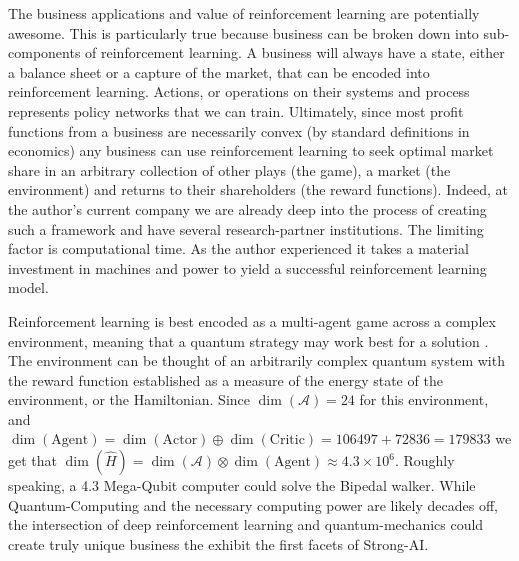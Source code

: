 \documentclass[doc, onecolumn, 12pt]{apa6}
\begin{document}
The business applications and value of reinforcement learning are potentially awesome. This is particularly true because business can be broken down into sub-components of reinforcement learning. A business will always have a state, either a balance sheet or a capture of the market, that can be encoded into reinforcement learning. Actions, or operations on their systems and process represents policy networks that we can train. Ultimately, since most profit functions from a business are necessarily convex (by standard definitions in economics) any business can use reinforcement learning to seek optimal market share in an arbitrary collection of other plays (the game), a market (the environment) and returns to their shareholders (the reward functions). Indeed, at the author's current company  we are already deep into the process of creating such a framework and have several research-partner institutions. The limiting factor is computational time. As the author experienced it takes a material investment in machines and power to yield a successful reinforcement learning model. 

Reinforcement learning is best encoded as a multi-agent game across a complex environment, meaning that a quantum strategy may work best for a solution \citep{Meyer:1999vs, Guo:2008kd}. The environment can be thought of an arbitrarily complex quantum system with the reward function established as a measure of the energy state of the environment, or the Hamiltonian. Since $\dim(\mathcal{A})=24$ for this environment, and $\dim(\text{Agent}) = \dim(\text{Actor}) \oplus \dim(\text{Critic}) = 106497 + 72836 = 179833$ we get that $\dim(\hat{H}) = \dim(\mathcal{A}) \otimes \dim(\text{Agent})  \approx 4.3 \times 10 ^{6}$. Roughly speaking, a 4.3 Mega-Qubit computer could solve the Bipedal walker. While Quantum-Computing and the necessary computing power are likely decades off, the intersection of deep reinforcement learning and quantum-mechanics could create truly unique business the exhibit the first facets of Strong-AI. 



\newpage

\cite{*}

\end{document}
